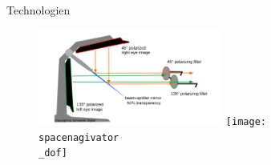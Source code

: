 \documentclass[final,hyperref={pdfpagelabels=false}]{beamer}
\begin{document}
\begin{frame}[t]
\begin{columns}[t]

\begin{column}{.025\textwidth}\end{column} %

\begin{column}{0.465\textwidth}

\begin{block}{Technologien}
   \begin{figure}
       \includegraphics[width=0.6\textwidth]{pluraviewTechnologie}
       \texttt{[image: spacenagivator\\\_dof]}
   \end{figure}
   
   
     
   
   
\end{block}


\end{column} %



\begin{column}{.025\textwidth}\end{column} %

\end{columns} %



\end{frame}
\end{document}
